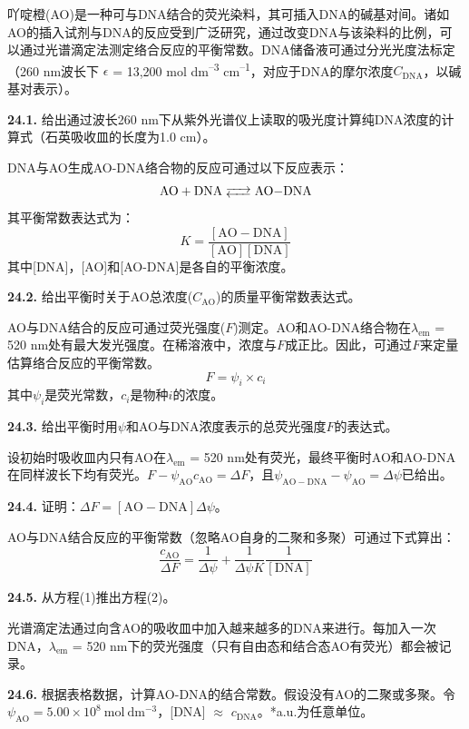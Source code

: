 吖啶橙(AO)是一种可与DNA结合的荧光染料，其可插入DNA的碱基对间。诸如AO的插入试剂与DNA的反应受到广泛研究，通过改变DNA与该染料的比例，可以通过光谱滴定法测定络合反应的平衡常数。DNA储备液可通过分光光度法标定（260 nm波长下 $\epsilon$ = 13,200 mol dm\textsuperscript{--3} cm\textsuperscript{--1}，对应于DNA的摩尔浓度$C_{\mathrm{DNA}}$，以碱基对表示）。

\noindent\textbf{24.1.}
给出通过波长260 nm下从紫外光谱仪上读取的吸光度计算纯DNA浓度的计算式（石英吸收皿的长度为1.0 cm）。

DNA与AO生成AO-DNA络合物的反应可通过以下反应表示：
\[\ce{AO + DNA <--> AO-DNA}\]
\noindent 其平衡常数表达式为：
\begin{equation}
    K = \frac{[\mathrm{AO-DNA}]}{[\mathrm{AO}][\mathrm{DNA}]}
\end{equation}
\noindent 其中[DNA]，[AO]和[AO-DNA]是各自的平衡浓度。

\noindent\textbf{24.2.}
给出平衡时关于AO总浓度($C_{\mathrm{AO}}$)的质量平衡常数表达式。

AO与DNA结合的反应可通过荧光强度(\(F\))测定。AO和AO-DNA络合物在$\lambda_{\mathrm{em}}$ = 520 nm处有最大发光强度。在稀溶液中，浓度与\(F\)成正比。因此，可通过\(F\)来定量估算络合反应的平衡常数。
\[F=\psi_i\times c_i\]
\noindent 其中$\psi_i$是荧光常数，$c_i$是物种\(i\)的浓度。

\noindent\textbf{24.3.}
给出平衡时用\(\psi\)和AO与DNA浓度表示的总荧光强度\(F\)的表达式。

设初始时吸收皿内只有AO在$\lambda_{\mathrm{em}}$ = 520 nm处有荧光，最终平衡时AO和AO-DNA在同样波长下均有荧光。$F - \psi_{\mathrm{AO}}c_{\mathrm{AO}} = \Delta  F$，且$\psi_{\mathrm{AO−DNA}} - \psi_{\mathrm{AO}} = \Delta  \psi$已给出。

\noindent\textbf{24.4.}
证明：$\Delta  F = [\mathrm{AO-DNA}]\Delta  \psi$。

AO与DNA结合反应的平衡常数（忽略AO自身的二聚和多聚）可通过下式算出：
\begin{equation}
    \frac{c_{\mathrm{AO}}}{\Delta F} = \frac{1}{\Delta \psi} + \frac{1}{\Delta \psi K}\frac{1}{[\mathrm{DNA}]}
\end{equation}

\noindent\textbf{24.5.}
从方程(1)推出方程(2)。

光谱滴定法通过向含AO的吸收皿中加入越来越多的DNA来进行。每加入一次DNA，$\lambda_{\mathrm{em}}$ = 520 nm下的荧光强度（只有自由态和结合态AO有荧光）都会被记录。

\noindent\textbf{24.6.} 根据表格数据，计算AO-DNA的结合常数。假设没有AO的二聚或多聚。令$\psi_{\mathrm{AO}} = \mathrm{5.00 \times 10^8\ mol\ dm^{-3}}$，[DNA] \(\approx\) $c_{\mathrm{DNA}}$。*a.u.为任意单位。


